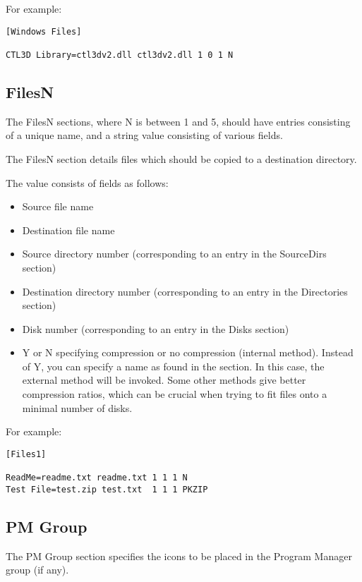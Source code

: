 For example:

\begin{verbatim}
[Windows Files]

CTL3D Library=ctl3dv2.dll ctl3dv2.dll 1 0 1 N
\end{verbatim}

\subsection{FilesN}

The FilesN sections, where N is between 1 and 5, should have entries consisting of
a unique name, and a string value consisting of various fields.

The FilesN section details files which should be copied
to a destination directory.

The value consists of fields as follows:

\begin{itemize}
\itemsep=0pt
\item Source file name
\item Destination file name
\item Source directory number (corresponding to an entry in the SourceDirs
section)
\item Destination directory number (corresponding to an entry in the Directories
section)
\item Disk number (corresponding to an entry in the Disks section)
\item Y or N specifying compression or no compression (internal method).
Instead of Y, you can specify a name as found in the  section.
In this case, the external method will be invoked. Some other methods give
better compression ratios, which can be crucial when trying to fit files
onto a minimal number of disks.
\end{itemize}

For example:

\begin{verbatim}
[Files1]

ReadMe=readme.txt readme.txt 1 1 1 N
Test File=test.zip test.txt  1 1 1 PKZIP
\end{verbatim}

\subsection{PM Group}

The PM Group section specifies the icons to be placed
in the Program Manager group (if any).

